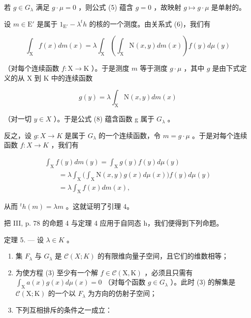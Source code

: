 若 \(g \in G_{\lambda}\) 满足 \(g \cdot \mu = 0\) ，则公式 (5) 蕴含 \(g = 0\) ，故映射 \(g \mapsto g \cdot \mu\) 是单射的。

设 \(m \in \mathrm{E}'\) 是属于 \(1_{\mathrm{E}'} - \lambda^t h\) 的核的一个测度。由关系式 (6)，我们有

\[
\int_ {\mathrm{X}} f (x) d m (x) = \lambda \int_ {\mathrm{X}} \left(\int_ {\mathrm{X}} \mathrm{N} (x, y) d m (x)\right) f (y) d \mu (y)\tag{7}
\]

（对每个连续函数 \(f: \mathrm{X} \to \mathrm{K}\) ）。于是测度 \(m\) 等于测度 \(g \cdot \mu\) ，其中 \(g\) 是由下式定义的从 \(\mathrm{X}\) 到 \(\mathrm{K}\) 中的连续函数

\[
g (y) = \lambda \int_ {\mathrm{X}} \mathrm{N} (x, y) d m (x)\tag{8}
\]

（对一切 \(y \in X\) ）。于是公式 (8) 蕴含函数 g 属于 \(G_{\lambda}\) 。

反之，设 \(g: X \to K\) 是属于 \(G_{\lambda}\) 的一个连续函数，令 \(m = g \cdot \mu\) 。于是对每个连续函数 \(f: X \to K\) ，我们有

\[
\begin{array}{l} \int_ {\mathrm{X}} f (y) d m (y) = \int_ {\mathrm{X}} g (y) f (y) d \mu (y) \\ \qquad = \lambda \int_ {\mathrm{X}} \Big (\int_ {\mathrm{X}} \mathrm{N} (x, y) g (x) d \mu (x) \Big) f (y) d \mu (y) \\ \qquad = \lambda \int_ {\mathrm{X}} f (x) d m (x), \end{array}
\]

从而 \({}^{t}h(m)=\lambda m\) 。这就证明了引理 4。

把 III, p. 78 的命题 4 与定理 4 应用于自同态 h，我们便得到下列命题。

定理 5. --- 设 \(\lambda\in K\) 。

\begin{enumerate}
\def\labelenumi{\alph{enumi})}
\item
  集 \(F_{\lambda}\) 与 \(G_{\lambda}\) 是 \(\mathcal{C}(X;K)\) 的有限维向量子空间，且它们的维数相等；
\item
  为使方程 (3) 至少有一个解 \(f \in \mathcal{C}(\mathrm{X}, \mathrm{K})\) ，必须且只需有 \(\int_{\mathrm{X}} a(x) g(x) d\mu(x) = 0\) （对每个函数 \(g \in G_{\lambda}\) ）。此时 (3) 的解集是 \(\mathcal{C}(\mathrm{X}; \mathrm{K})\) 的一个以 \(F_{\lambda}\) 为方向的仿射子空间；
\item
  下列互相排斥的条件之一成立：
\end{enumerate}

